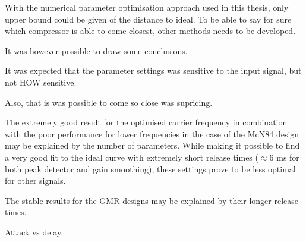 \documentclass[../main2.tex]{subfiles}
\begin{document}

With the numerical parameter optimisation approach used in this thesis, only upper bound could be given of the distance to ideal. To be able to say for sure which compressor is able to come closest, other methods needs to be developed.

It was however possible to draw some conclusions.

It was expected that the parameter settings was sensitive to the input signal, but not HOW sensitive.


Also, that is was possible to come so close was supricing. 


The extremely good result for the optimised carrier frequency in combination with the poor performance for lower frequencies in the case of the McN84 design may be explained by the number of parameters. While making it possible to find a very good fit to the ideal curve with extremely short release times ($\approx 6$ ms for both peak detector and gain smoothing), these settings prove to be less optimal for other signals.

The stable results for the GMR designs may be explained by their longer release times.

Attack vs delay. 

\end{document}
